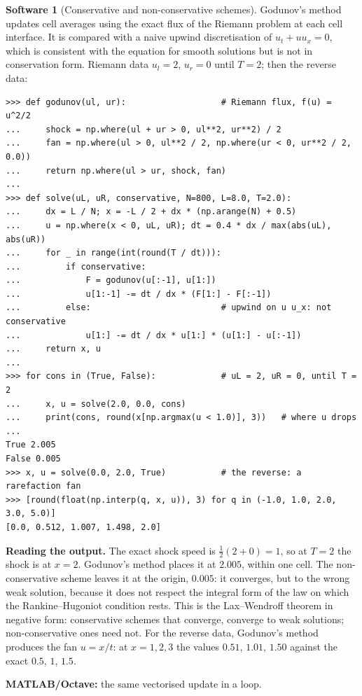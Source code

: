 \documentclass[11pt,a4paper]{article}
\numberwithin{equation}{section}
\theoremstyle{definition}
\newtheorem{software}[thm]{Software}
\begin{document}
\begin{software}[Conservative and non-conservative schemes]
\label{sw:godunov}
Godunov's method updates cell averages using the exact flux of the Riemann problem at each cell interface. It is compared with a naive upwind discretisation of $u_t + uu_x = 0$, which is consistent with
the equation for smooth solutions but is not in conservation form. Riemann data $u_l = 2$, $u_r = 0$ until $T = 2$; then the reverse data:
{\small\begin{verbatim}
>>> def godunov(ul, ur):                   # Riemann flux, f(u) = u^2/2
...     shock = np.where(ul + ur > 0, ul**2, ur**2) / 2
...     fan = np.where(ul > 0, ul**2 / 2, np.where(ur < 0, ur**2 / 2, 0.0))
...     return np.where(ul > ur, shock, fan)
...
>>> def solve(uL, uR, conservative, N=800, L=8.0, T=2.0):
...     dx = L / N; x = -L / 2 + dx * (np.arange(N) + 0.5)
...     u = np.where(x < 0, uL, uR); dt = 0.4 * dx / max(abs(uL), abs(uR))
...     for _ in range(int(round(T / dt))):
...         if conservative:
...             F = godunov(u[:-1], u[1:])
...             u[1:-1] -= dt / dx * (F[1:] - F[:-1])
...         else:                          # upwind on u u_x: not conservative
...             u[1:] -= dt / dx * u[1:] * (u[1:] - u[:-1])
...     return x, u
...
>>> for cons in (True, False):             # uL = 2, uR = 0, until T = 2
...     x, u = solve(2.0, 0.0, cons)
...     print(cons, round(x[np.argmax(u < 1.0)], 3))   # where u drops
...
True 2.005
False 0.005
>>> x, u = solve(0.0, 2.0, True)           # the reverse: a rarefaction fan
>>> [round(float(np.interp(q, x, u)), 3) for q in (-1.0, 1.0, 2.0, 3.0, 5.0)]
[0.0, 0.512, 1.007, 1.498, 2.0]
\end{verbatim}}
\textbf{Reading the output.} The exact shock speed is $\frac12(2 + 0) = 1$, so at $T = 2$ the shock is at $x = 2$. Godunov's method places it at $2.005$, within one cell. The non-conservative scheme leaves it at the origin, $0.005$: it
converges, but to the wrong weak solution, because it does not respect the integral form of the law on which the Rankine--Hugoniot condition rests. This is the Lax--Wendroff theorem in negative form:
conservative schemes that converge, converge to weak solutions; non-conservative ones need not. For the reverse data, Godunov's method produces the fan $u = x/t$: at $x = 1, 2, 3$ the values $0.51$, $1.01$, $1.50$
against the exact $0.5$, $1$, $1.5$.

\textbf{MATLAB/Octave:} the same vectorised update in a loop.
\end{software}
\end{document}
